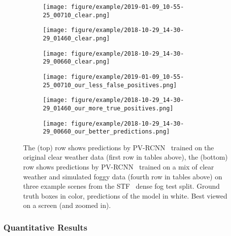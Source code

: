 \documentclass[10pt,twocolumn,letterpaper]{article}
\begin{document}
\begin{figure*}
     \centering
     \begin{subfigure}[b]{0.325\linewidth}
         \centering
         \texttt{[image: figure/example/2019-01-09\_10-55-25\_00710\_clear.png]}
     \end{subfigure}
     \hfill
     \begin{subfigure}[b]{0.325\linewidth}
         \centering
         \texttt{[image: figure/example/2018-10-29\_14-30-29\_01460\_clear.png]}
     \end{subfigure}
     \hfill
     \begin{subfigure}[b]{0.325\linewidth}
         \centering
         \texttt{[image: figure/example/2018-10-29\_14-30-29\_00660\_clear.png]}
     \end{subfigure}
     \hfill
     \begin{subfigure}[b]{0.325\linewidth}
         \centering
         \texttt{[image: figure/example/2019-01-09\_10-55-25\_00710\_our\_less\_false\_positives.png]}
     \end{subfigure}
     \hfill
     \begin{subfigure}[b]{0.325\linewidth}
         \centering
         \texttt{[image: figure/example/2018-10-29\_14-30-29\_01460\_our\_more\_true\_positives.png]}
     \end{subfigure}
     \hfill
     \begin{subfigure}[b]{0.325\linewidth}
         \centering
         \texttt{[image: figure/example/2018-10-29\_14-30-29\_00660\_our\_better\_predictions.png]}
     \end{subfigure}
     \caption{The (top) row shows predictions by PV-RCNN~\cite{PV-RCNN} trained on the original clear weather data (first row in tables above), the (bottom) row shows predictions by PV-RCNN~\cite{PV-RCNN} trained on a mix of clear weather and simulated foggy data (fourth row in tables above) on three example scenes from the STF~\cite{STF} dense fog test split. Ground truth boxes in color, predictions of the model in white. Best viewed on a screen (and zoomed in).}
     \label{fig:prediction_comparison}
\end{figure*}

\subsubsection{Quantitative Results}
\label{sec:quantitative}
\end{document}
